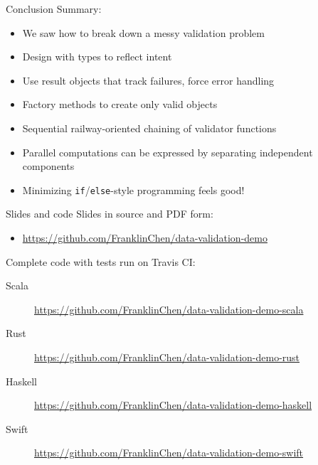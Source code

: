 \begin{frame}{Conclusion}
  Summary:
  \begin{itemize}
  \item We saw how to break down a messy validation problem
  \item Design with types to reflect intent
  \item Use result objects that track failures, force error handling
  \item Factory methods to create only valid objects
  \item Sequential railway-oriented chaining of validator functions
  \item Parallel computations can be expressed by separating
    independent components
  \item Minimizing
    \texttt{if}/\texttt{else}-style programming feels good!
  \end{itemize}
\end{frame}

\begin{frame}{Slides and code}
  Slides in source and PDF form:
  \begin{itemize}
  \item \url{https://github.com/FranklinChen/data-validation-demo}
  \end{itemize}

  Complete code with tests run on Travis CI:
  \begin{description}
  \item[Scala] \url{https://github.com/FranklinChen/data-validation-demo-scala}
  \item[Rust] \url{https://github.com/FranklinChen/data-validation-demo-rust}
  \item[Haskell] \url{https://github.com/FranklinChen/data-validation-demo-haskell}
  \item[Swift] \url{https://github.com/FranklinChen/data-validation-demo-swift}
  \end{description}
\end{frame}


